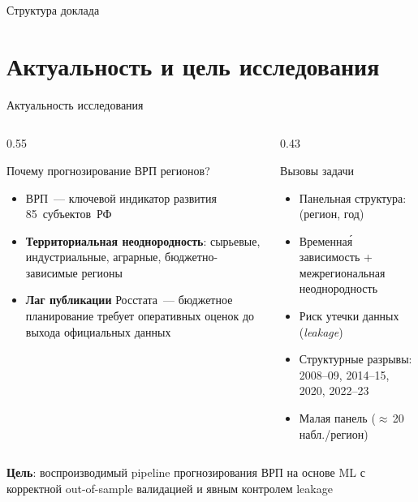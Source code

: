 \documentclass[aspectratio=169,10pt]{beamer}
\begin{document}
\begin{frame}{Структура доклада}
  \tableofcontents[subsectionstyle=hide]
\end{frame}

\section{Актуальность и цель исследования}

\begin{frame}{Актуальность исследования}
\begin{columns}[T]
  \begin{column}{0.55\textwidth}
    \begin{block}{Почему прогнозирование ВРП регионов?}
      \begin{itemize}\setlength{\itemsep}{0pt}
        \item ВРП~— ключевой индикатор развития 85~субъектов~РФ
        \item \textbf{Территориальная неоднородность}: сырьевые,
              индустриальные, аграрные, бюджетно-зависимые регионы
        \item \textbf{Лаг публикации} Росстата~— бюджетное планирование
              требует оперативных оценок до выхода официальных данных
      \end{itemize}
    \end{block}
  \end{column}
  \begin{column}{0.43\textwidth}
    \begin{block}{Вызовы задачи}
      \begin{itemize}\setlength{\itemsep}{0pt}
        \item Панельная структура: (регион, год)
        \item Временна\'{я} зависимость + межрегиональная неоднородность
        \item Риск утечки данных (\textit{leakage})
        \item Структурные разрывы: 2008–09, 2014–15, 2020, 2022–23
        \item Малая панель ($\approx$\,20 набл./регион)
      \end{itemize}
    \end{block}
  \end{column}
\end{columns}
\vspace{0.1em}
\begin{alertblock}{}
  \centering
  \textbf{Цель}: воспроизводимый pipeline прогнозирования ВРП на основе ML
  с корректной out-of-sample валидацией и явным контролем leakage
\end{alertblock}
\end{frame}
\end{document}
